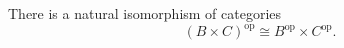 There is a natural isomorphism of categories
$$(B \times C)^{\mathrm{op}} \cong B^{\mathrm{op}} \times C^{\mathrm{op}}.$$
